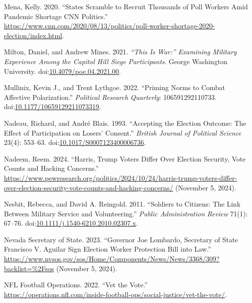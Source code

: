 \documentclass[
  12pt,
  letterpaper,
]{article}
\newlength{\cslhangindent}
\newenvironment{CSLReferences}[2] %
 {\begin{list}{}{%
  \setlength{\itemindent}{0pt}
  \setlength{\leftmargin}{0pt}
  \setlength{\parsep}{0pt}
  \ifodd #1
   \setlength{\leftmargin}{\cslhangindent}
   \setlength{\itemindent}{-1\cslhangindent}
  \fi
  \setlength{\itemsep}{#2\baselineskip}}}
 {\end{list}}
\begin{document}
\begin{CSLReferences}{1}{1}
Mena, Kelly. 2020. {``States Scramble to Recruit Thousands of Poll
Workers Amid Pandemic Shortage \textbar{} {CNN Politics}.''}
\url{https://www.cnn.com/2020/08/13/politics/poll-worker-shortage-2020-election/index.html}.

Milton, Daniel, and Andrew Mines. 2021. \emph{{``{This} Is {War}:''}
{Examining Military Experience Among} the {Capitol Hill Siege
Participants}}. George Washington University.
doi:\href{https://doi.org/10.4079/poe.04.2021.00}{10.4079/poe.04.2021.00}.

Mullinix, Kevin J., and Trent Lythgoe. 2022. {``Priming {Norms} to
{Combat Affective Polarization}.''} \emph{Political Research Quarterly}:
106591292110733.
doi:\href{https://doi.org/10.1177/10659129211073319}{10.1177/10659129211073319}.

Nadeau, Richard, and André Blais. 1993. {``Accepting the {Election
Outcome}: {The Effect} of {Participation} on {Losers}' {Consent}.''}
\emph{British Journal of Political Science} 23(4): 553--63.
doi:\href{https://doi.org/10.1017/S0007123400006736}{10.1017/S0007123400006736}.

Nadeem, Reem. 2024. {``Harris, {Trump Voters Differ Over Election
Security}, {Vote Counts} and {Hacking Concerns}.''}
\url{https://www.pewresearch.org/politics/2024/10/24/harris-trump-voters-differ-over-election-security-vote-counts-and-hacking-concerns/}
(November 5, 2024).

Nesbit, Rebecca, and David A. Reingold. 2011. {``Soldiers to {Citizens}:
{The Link} Between {Military Service} and {Volunteering}.''}
\emph{Public Administration Review} 71(1): 67--76.
doi:\href{https://doi.org/10.1111/j.1540-6210.2010.02307.x}{10.1111/j.1540-6210.2010.02307.x}.

Nevada Secretary of State. 2023. {``Governor {Joe Lombardo}, {Secretary}
of {State Francisco V}. {Aguilar} Sign {Election Worker Protection Bill}
into Law.''}
\url{https://www.nvsos.gov/sos/Home/Components/News/News/3368/309?backlist=\%2Fsos}
(November 5, 2024).

NFL Football Operations. 2022. {``Vet the {Vote}.''}
\url{https://operations.nfl.com/inside-football-ops/social-justice/vet-the-vote/}.


\end{CSLReferences}
\end{document}
